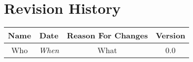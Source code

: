 \chapter*{Revision History}

\begin{center}
    \begin{tabular}{|c|c|c|c|}
        \hline
	    Name & Date & Reason For Changes & Version\\
        \hline
	    Who & \emph{When} & What & 0.0 \\ \hline
        \hline
    \end{tabular}
\end{center}